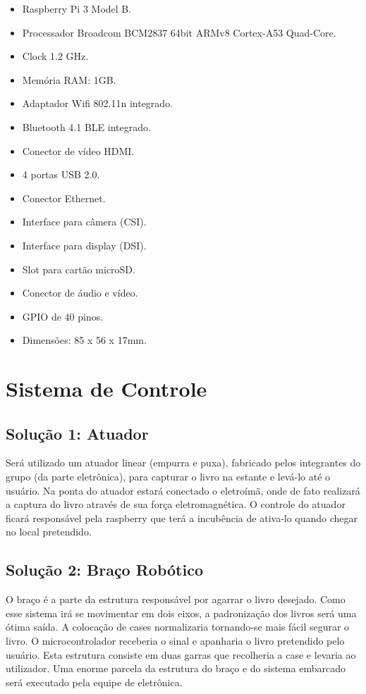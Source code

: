 \begin{itemize}
\item Raspberry Pi 3 Model B.
\item Processador Broadcom BCM2837 64bit ARMv8 Cortex-A53 Quad-Core.
\item Clock 1.2 GHz.
\item Memória RAM: 1GB.
\item Adaptador Wifi 802.11n integrado.
\item Bluetooth 4.1 BLE integrado.
\item Conector de vídeo HDMI.
\item 4 portas USB 2.0.
\item Conector Ethernet.
\item Interface para câmera (CSI).
\item Interface para display (DSI).
\item Slot para cartão microSD.
\item Conector de áudio e vídeo.
\item GPIO de 40 pinos.
\item Dimensões: 85 x 56 x 17mm.
\end{itemize}

\section{Sistema de Controle}
\subsection{Solução 1: Atuador}
Será utilizado um atuador linear (empurra e puxa), fabricado pelos integrantes do grupo (da parte eletrônica), para capturar o livro na estante e levá-lo até o usuário. Na ponta do atuador estará conectado o eletroímã, onde de fato realizará a captura do livro através de sua força eletromagnética. O controle do atuador ficará responsável pela raspberry que terá a incubência de ativa-lo quando chegar no local pretendido. 

\subsection{Solução 2: Braço Robótico}
O braço é a parte da estrutura responsável por agarrar o livro desejado. Como esse sistema irá se movimentar em dois eixos, a padronização dos livros será uma ótima saída. A colocação de cases normalizaria tornando-se mais fácil segurar o livro. O microcontrolador receberia o sinal e apanharia o livro pretendido pelo usuário. Esta estrutura consiste em duas garras que recolheria a case e levaria ao utilizador. Uma enorme parcela da estrutura do braço e do sistema embarcado será executado pela equipe de eletrônica. 

